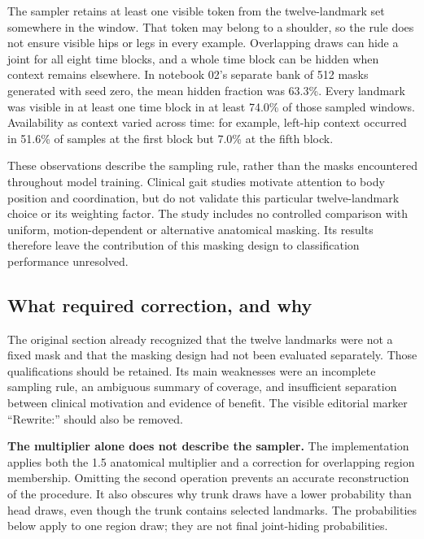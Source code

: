 \documentclass[
  11pt,
]{article}
\begin{document}
The sampler retains at least one visible token from the twelve-landmark
set somewhere in the window. That token may belong to a shoulder, so the
rule does not ensure visible hips or legs in every example. Overlapping
draws can hide a joint for all eight time blocks, and a whole time block
can be hidden when context remains elsewhere. In notebook 02's separate
bank of 512 masks generated with seed zero, the mean hidden fraction was
63.3\%. Every landmark was visible in at least one time block in at
least 74.0\% of those sampled windows. Availability as context varied
across time: for example, left-hip context occurred in 51.6\% of samples
at the first block but 7.0\% at the fifth block.

These observations describe the sampling rule, rather than the masks
encountered throughout model training. Clinical gait studies motivate
attention to body position and coordination, but do not validate this
particular twelve-landmark choice or its weighting factor. The study
includes no controlled comparison with uniform, motion-dependent or
alternative anatomical masking. Its results therefore leave the
contribution of this masking design to classification performance
unresolved.

\clearpage
\subsection{What required correction, and
why}\label{what-required-correction-and-why}

The original section already recognized that the twelve landmarks were
not a fixed mask and that the masking design had not been evaluated
separately. Those qualifications should be retained. Its main weaknesses
were an incomplete sampling rule, an ambiguous summary of coverage, and
insufficient separation between clinical motivation and evidence of
benefit. The visible editorial marker ``Rewrite:'' should also be
removed.

\textbf{The multiplier alone does not describe the sampler.} The
implementation applies both the 1.5 anatomical multiplier and a
correction for overlapping region membership. Omitting the second
operation prevents an accurate reconstruction of the procedure. It also
obscures why trunk draws have a lower probability than head draws, even
though the trunk contains selected landmarks. The probabilities below
apply to one region draw; they are not final joint-hiding probabilities.
\end{document}
